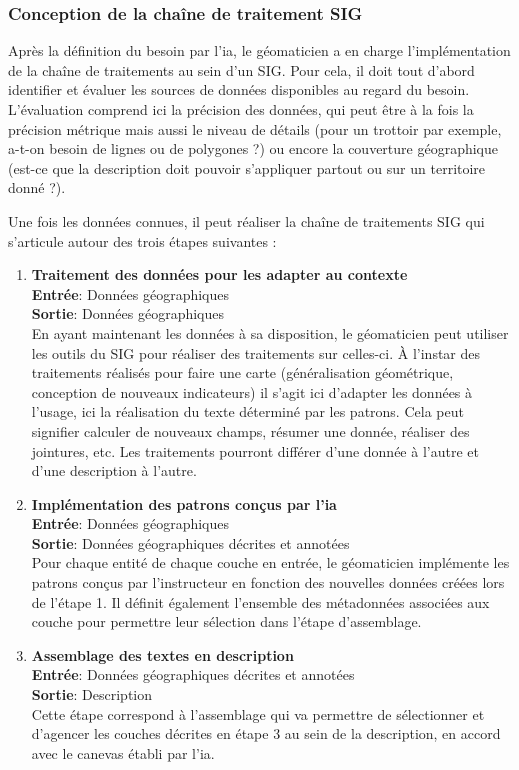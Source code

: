 \subsubsection{Conception de la chaîne de traitement SIG}

Après la définition du besoin par l’\gls{ia}, le géomaticien a en charge l’implémentation de la chaîne de traitements au sein d’un SIG. Pour cela, il doit tout d’abord identifier et évaluer les sources de données disponibles au regard du besoin. L’évaluation comprend ici la précision des données, qui peut être à la fois la précision métrique mais aussi le niveau de détails (pour un trottoir par exemple, a-t-on besoin de lignes ou de polygones ?) ou encore la couverture géographique (est-ce que la description doit pouvoir s’appliquer partout ou sur un territoire donné ?).

\newpar{}

Une fois les données connues, il peut réaliser la chaîne de traitements SIG qui s’articule autour des trois étapes suivantes :

\begin{enumerate}
    \item \textbf{Traitement des données pour les adapter au contexte}\\
            \textbf{Entrée}: Données géographiques\\
            \textbf{Sortie}: Données géographiques\\
            En ayant maintenant les données à sa disposition, le géomaticien peut utiliser les outils du SIG pour réaliser des traitements sur celles-ci. À l’instar des traitements réalisés pour faire une carte (généralisation géométrique, conception de nouveaux indicateurs) il s’agit ici d’adapter les données à l’usage, ici la réalisation du texte déterminé par les patrons. Cela peut signifier calculer de nouveaux champs, résumer une donnée, réaliser des jointures, etc. Les traitements pourront différer d’une donnée à l’autre et d’une description à l’autre.
    \item \textbf{Implémentation des patrons conçus par l’\gls{ia}}\\
        \textbf{Entrée}: Données géographiques\\
        \textbf{Sortie}: Données géographiques décrites et annotées\\
        Pour chaque entité de chaque couche en entrée, le géomaticien implémente les patrons conçus par l’instructeur en fonction des nouvelles données créées lors de l’étape 1. Il définit également l’ensemble des métadonnées associées aux couche pour permettre leur sélection dans l’étape d’assemblage. 
    \item \textbf{Assemblage des textes en description}\\
        \textbf{Entrée}: Données géographiques décrites et annotées\\
        \textbf{Sortie}: Description\\
        Cette étape correspond à l’assemblage qui va permettre de sélectionner et d’agencer les couches décrites en étape 3 au sein de la description, en accord avec le canevas établi par l’\gls{ia}.
\end{enumerate}

